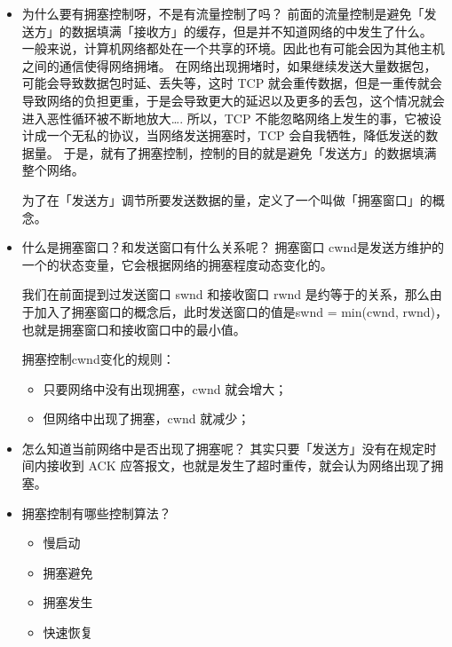 \documentclass[11pt]{article}
\begin{document}
\begin{itemize}
\item 为什么要有拥塞控制呀，不是有流量控制了吗？
前面的流量控制是避免「发送方」的数据填满「接收方」的缓存，但是并不知道网络的中发生了什么。
一般来说，计算机网络都处在一个共享的环境。因此也有可能会因为其他主机之间的通信使得网络拥堵。
在网络出现拥堵时，如果继续发送大量数据包，可能会导致数据包时延、丢失等，这时 TCP 就会重传数据，但是一重传就会导致网络的负担更重，于是会导致更大的延迟以及更多的丢包，这个情况就会进入恶性循环被不断地放大\ldots{}.
所以，TCP 不能忽略网络上发生的事，它被设计成一个无私的协议，当网络发送拥塞时，TCP 会自我牺牲，降低发送的数据量。
于是，就有了拥塞控制，控制的目的就是避免「发送方」的数据填满整个网络。

为了在「发送方」调节所要发送数据的量，定义了一个叫做「拥塞窗口」的概念。

\item 什么是拥塞窗口？和发送窗口有什么关系呢？
拥塞窗口 cwnd是发送方维护的一个的状态变量，它会根据网络的拥塞程度动态变化的。

我们在前面提到过发送窗口 swnd 和接收窗口 rwnd 是约等于的关系，那么由于加入了拥塞窗口的概念后，此时发送窗口的值是swnd = min(cwnd, rwnd)，也就是拥塞窗口和接收窗口中的最小值。

拥塞控制cwnd变化的规则：
\begin{itemize}
\item 只要网络中没有出现拥塞，cwnd 就会增大；

\item 但网络中出现了拥塞，cwnd 就减少；
\end{itemize}

\item 怎么知道当前网络中是否出现了拥塞呢？
其实只要「发送方」没有在规定时间内接收到 ACK 应答报文，也就是发生了超时重传，就会认为网络出现了拥塞。

\item 拥塞控制有哪些控制算法？
\begin{itemize}
\item 慢启动

\item 拥塞避免

\item 拥塞发生

\item 快速恢复
\end{itemize}
\end{itemize}
\end{document}

